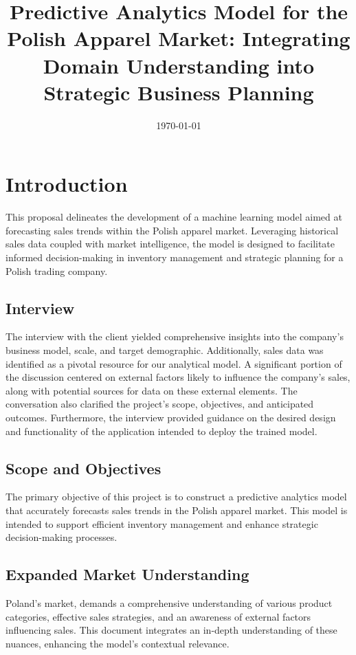 \documentclass{article}
\begin{document}
\title{Predictive Analytics Model for the Polish Apparel Market: Integrating Domain Understanding into Strategic Business Planning}
\date{\today}
\maketitle

\newpage
\tableofcontents
\newpage

\section{Introduction}
This proposal delineates the development of a machine learning model aimed at forecasting sales trends within the Polish apparel market. Leveraging historical sales data coupled with market intelligence, the model is designed to facilitate informed decision-making in inventory management and strategic planning for a Polish trading company.

\subsection{Interview} 
The interview with the client yielded comprehensive insights into the company's business model, scale, and target demographic. Additionally, sales data was identified as a pivotal resource for our analytical model. A significant portion of the discussion centered on external factors likely to influence the company's sales, along with potential sources for data on these external elements. The conversation also clarified the project's scope, objectives, and anticipated outcomes. Furthermore, the interview provided guidance on the desired design and functionality of the application intended to deploy the trained model.

\subsection{Scope and Objectives}
The primary objective of this project is to construct a predictive analytics model that accurately forecasts sales trends in the Polish apparel market. This model is intended to support efficient inventory management and enhance strategic decision-making processes.


\subsection{Expanded Market Understanding}
Poland's market, demands a comprehensive understanding of various product categories, effective sales strategies, and an awareness of external factors influencing sales. This document integrates an in-depth understanding of these nuances, enhancing the model's contextual relevance.
\end{document}
